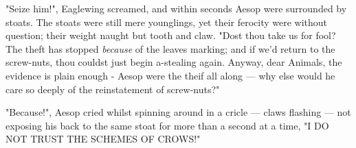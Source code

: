 
"Seize him!", Eaglewing screamed, and within seconds Aesop were surrounded by stoats. The stoats were still mere younglings, yet their ferocity were without question; their weight naught but tooth and claw. "Dost thou take us for fool? The theft has stopped \textit{because} of the leaves marking; and if we'd return to the screw-nuts, thou couldst just begin a-stealing again. Anyway, dear Animals, the evidence is plain enough - Aesop were the theif all along — why else would he care so deeply of the reinstatement of screw-nuts?"





"Because!", Aesop cried whilst spinning around in a cricle — claws flashing — not exposing his back to the same stoat for more than a second at a time, "I DO NOT TRUST THE SCHEMES OF CROWS!"



